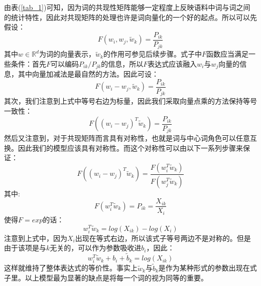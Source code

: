 \documentclass[UTF8, 12pt]{ctexart}
\begin{document}
	由表(\ref{tab_1})可知，因为词的共现性矩阵能够一定程度上反映语料中词与词之间的统计特性，因此对共现矩阵的处理也许是词向量化的一个好的起点。所以可以先假设：
	\begin{equation}
		F(w_{i}, w_{j}, \tilde{w}_{k}) = \frac{P_{ik}}{P_{jk}}
	\end{equation}
	其中$w \in \mathbb{R}^{d}$为词的向量表示，$\tilde{w}_{k}$的作用可参见后续步骤。式子中$F$函数应当满足一些条件：首先$F$可以编码$P_{ik}/P_{jk}$的信息，所以$F$表达式应该融入$w_{i}$与$w_{j}$向量的信息，其中向量加减法是最自然的方法。因此可设：
	\begin{equation}
		F(w_{i} - w_{j}, \tilde{w}_{k}) = \frac{P_{ik}}{P_{jk}}
	\end{equation}
	其次，我们注意到上式中等号右边为标量，因此我们采取向量点乘的方法保持等号一致性：
	\begin{equation}
		F((w_{i} - w_{j})^{T}\tilde{w}_{k}) = \frac{P_{ik}}{P_{jk}}
	\end{equation}
	然后又注意到，对于共现矩阵而言具有对称性，也就是词与中心词角色可以任意互换。因此我们的模型应该具有对称性。而这个对称性可以由以下一系列步骤来保证：
	\begin{equation}
		F((w_{i} - w_{j})^{T}\tilde{w}_{k}) = \frac{F(w_{i}^{T}\tilde{w}_{k})}{F(w_{j}^{T}\tilde{w}_{k})}
	\end{equation}
	其中:
	\begin{equation}
		F(w_{i}^{T}\tilde{w}_{k}) = P_{ik} = \frac{X_{ik}}{X_{i}}
	\end{equation}
	使得$F = exp$的话：
	\begin{equation}
		w_{i}^{T}\tilde{w}_{k} = log(X_{ik}) - log(X_{i})
	\end{equation}
	注意到上式中，因为$X_{i}$出现在等式右边，所以该式子等号两边不是对称的。但是由于该项是与$k$无关的，可以作为参数吸收进$b_{i}$，因此：
	\begin{equation}
		w_{i}^{T}\tilde{w}_{k} + b_{i} + \tilde{b}_{k} = log(X_{ik})
	\end{equation}
	这样就维持了整体表达式的等价性。事实上$\tilde{w}_{k}$与$\tilde{b}_{k}$是作为某种形式的参数出现在式子里。以上模型最为显著的缺点是将每一个词的视为同等的重要。
\end{document}
